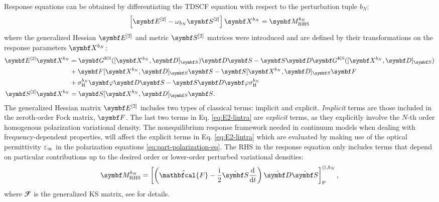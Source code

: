 Response equations can be obtained by differentiating the
\acrshort{TDSCF} equation with respect to the perturbation tuple
$b_N$:\autocite{Thorvaldsen2008-sg, Ringholm2014-gx}
\begin{equation}\label{eq:response-equation}
 \left[\genHessian - \omega_{b_N}\genMetric \right]\rspParam{b_N} = \RHS{b_N}
\end{equation}
where the generalized Hessian $\genHessian$ and metric $\genMetric$
matrices were introduced and are defined by their transformations on the
response parameters $\rspParam{b_N}$:\autocite{Larsen2000-hj,
Kjaergaard2008-hy}
\begin{subequations}
\begin{align}
  \genHessian\rspParam{b_N} &=
  \mat{G}^\mathrm{KS}([\rspParam{b_N}, \mat{D}]_{\mat{S}})\mat{D}\mat{S}
  -\mat{S}\mat{D}\mat{G}^\mathrm{KS}([\rspParam{b_N},
  \mat{D}]_{\mat{S}}) \nonumber \\
&+\mat{F} [\rspParam{b_N}, \mat{D}]_{\mat{S}} \mat{S}
-\mat{S} [\rspParam{b_N}, \mat{D}]_{\mat{S}} \mat{F}
\label{eq:E2-lintra} \\
&+ \ASCh{b_N}\mat{\esp}\mat{D}\mat{S}
-\mat{S}\mat{D}\mat{\esp}\ASCh{b_N} \nonumber
\\
  \genMetric\rspParam{b_N} &= \mat{S} [\rspParam{b_N}, \mat{D}]_{\mat{S}} \mat{S} \text{.}
  \label{eq:S2-lintra}
\end{align}
\end{subequations}
The generalized Hessian matrix $\genHessian$ includes two types of
classical terms: implicit and explicit. \emph{Implicit} terms are those
included in the zeroth-order Fock matrix, $\mat{F}$.
The last two terms in Eq. \ref{eq:E2-lintra} are \emph{explicit} terms,
as they explicitly involve the $N$-th order homogenous polarization
variational density.
The nonequilibrium response framework needed in continuum models when
dealing with frequency-dependent properties,\autocite{Cammi1999-rb, Tomasi2005-vm}
will affect the explicit terms in Eq. \ref{eq:E2-lintra} which are
evaluated by making use of the optical permittivity $\varepsilon_\infty$ in the
polarization equations \eqref{eq:part-polarization-eq}.
The \acrlong*{RHS} in the response equation only includes terms that
depend on particular contributions up to the desired order or
lower-order perturbed variational densities:\autocite{Ringholm2014-gx}
\begin{equation}\label{eq:RHS}
  \RHS{b_N} =
  \left[\left( \tilde{\mathbfcal{F}}
-
\frac{\mathrm{i}}{2}\pertmat{S}\deriv{}{t}\right)\pertmat{D}\pertmat{S}\right]^{\ominus,
b_N}_\mathrm{P},
\end{equation}
where $\mathbfcal{F}$ is the generalized \acrshort*{KS} matrix, see
 for details.

